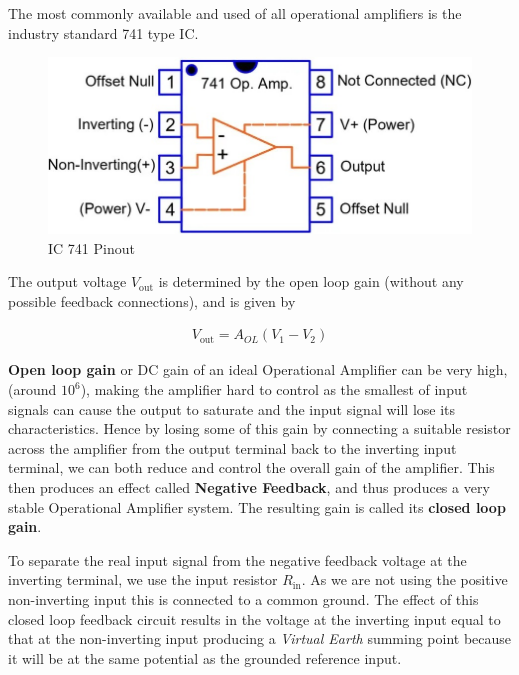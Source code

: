 The most commonly available and used of all operational amplifiers is the industry standard 741 type IC. 

\begin{figure}[H]
    \centering
    \includegraphics[width=0.95\columnwidth]{images/pinout.jpeg}
    \caption{IC 741 Pinout}
    \label{fig:1}
\end{figure}

The output voltage $V_\text{out}$ is determined by the open loop gain (without any possible feedback connections), and is given by 

\begin{align}V_\text{out}=A_{OL}(V_1-V_2)\end{align} 

\textbf{Open loop gain} or DC gain of an ideal Operational Amplifier can be very high, (around $10^6$), making the amplifier hard to control as the smallest of input signals can cause the output to saturate and the input signal will lose its characteristics. Hence by losing some of this gain by connecting a suitable resistor across the amplifier from the output terminal back to the inverting input terminal, we can both reduce and control the overall gain of the amplifier. This then produces an effect called \textbf{Negative Feedback}, and thus produces a very stable Operational Amplifier system. The resulting gain is called its \textbf{closed loop gain}.



To separate the real input signal from the negative feedback voltage at the inverting terminal, we use the input resistor $R_\text{in}$. As we are not using the positive non-inverting input this is connected to a common ground.
The effect of this closed loop feedback circuit results in the voltage at the inverting input equal to that at the non-inverting input producing a \textit{Virtual Earth} summing point because it will be at the same potential as the grounded reference input. 

